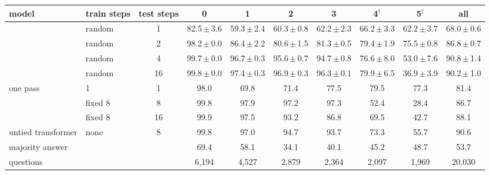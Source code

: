 \begin{tabular}{llcccccccc}
\toprule
model & train steps & test steps & 0 & 1 & 2 & 3 & 4$^\dagger$ & 5$^\dagger$ & all \\
\midrule
\zr{} & random & 1 & 82.5\,$\pm$\,3.6 & 59.3\,$\pm$\,2.4 & 60.3\,$\pm$\,0.8 & 62.2\,$\pm$\,2.3 & 66.2\,$\pm$\,3.3 & 62.2\,$\pm$\,3.7 & 68.0\,$\pm$\,0.6 \\
\zr{} & random & 2 & 98.2\,$\pm$\,0.0 & 86.4\,$\pm$\,2.2 & 80.6\,$\pm$\,1.5 & 81.3\,$\pm$\,0.5 & 79.4\,$\pm$\,1.9 & 75.5\,$\pm$\,0.8 & 86.8\,$\pm$\,0.7 \\
\zr{} & random & 4 & 99.7\,$\pm$\,0.0 & 96.7\,$\pm$\,0.3 & 95.6\,$\pm$\,0.7 & 94.7\,$\pm$\,0.8 & 76.6\,$\pm$\,8.0 & 53.0\,$\pm$\,7.6 & 90.8\,$\pm$\,1.4 \\
\zr{} & random & 16 & 99.8\,$\pm$\,0.0 & 97.4\,$\pm$\,0.3 & 96.9\,$\pm$\,0.3 & 96.3\,$\pm$\,0.1 & 79.9\,$\pm$\,6.5 & 36.9\,$\pm$\,3.9 & 90.2\,$\pm$\,1.0 \\
one pass & 1 & 1 & 98.0 & 69.8 & 71.4 & 77.5 & 79.5 & 77.3 & 81.4 \\
\zr{} & fixed 8 & 8 & 99.8 & 97.9 & 97.2 & 97.3 & 52.4 & 28.4 & 86.7 \\
\zr{} & fixed 8 & 16 & 99.9 & 97.5 & 93.2 & 86.8 & 69.5 & 42.7 & 88.1 \\
untied transformer & none & 8 & 99.8 & 97.0 & 94.7 & 93.7 & 73.3 & 55.7 & 90.6 \\
\midrule
majority answer & & & 69.4 & 58.1 & 34.1 & 40.1 & 45.2 & 48.7 & 53.7 \\
questions & & & 6,194 & 4,527 & 2,879 & 2,364 & 2,097 & 1,969 & 20,030 \\
\bottomrule
\end{tabular}

